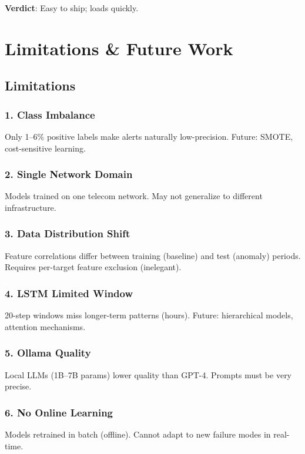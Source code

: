 \documentclass[11pt,a4paper,oneside]{report}
\begin{document}
\textbf{Verdict}: Easy to ship; loads quickly.

\newpage

\chapter{Limitations \& Future Work}

\section{Limitations}

\subsection{1. Class Imbalance}
Only 1--6\% positive labels make alerts naturally low-precision. Future: SMOTE, cost-sensitive learning.

\subsection{2. Single Network Domain}
Models trained on one telecom network. May not generalize to different infrastructure.

\subsection{3. Data Distribution Shift}
Feature correlations differ between training (baseline) and test (anomaly) periods. Requires per-target feature exclusion (inelegant).

\subsection{4. LSTM Limited Window}
20-step windows miss longer-term patterns (hours). Future: hierarchical models, attention mechanisms.

\subsection{5. Ollama Quality}
Local LLMs (1B--7B params) lower quality than GPT-4. Prompts must be very precise.

\subsection{6. No Online Learning}
Models retrained in batch (offline). Cannot adapt to new failure modes in real-time.
\end{document}

